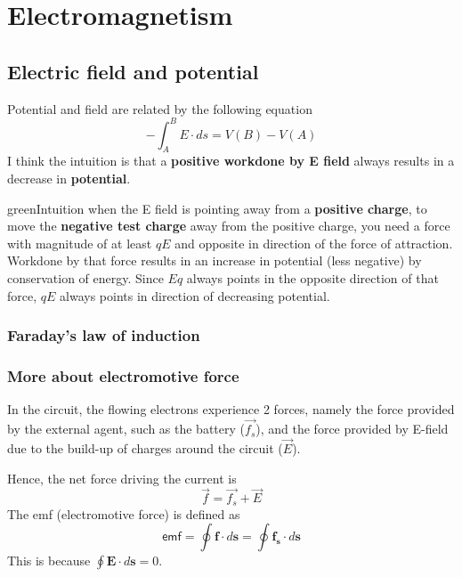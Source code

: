 \chapter{Electromagnetism}
\section{Electric field and potential}
Potential and field are related by the following equation
\begin{equation}
    -\int_A^B E \cdot ds = V(B)-V(A)
\end{equation}
I think the intuition is that a \textbf{positive workdone by E field} always results in a decrease in \textbf{potential}.

\begin{mybox}{green}{Intuition}
    when the E field is pointing away from a \textbf{positive charge}, to move the \textbf{negative test charge} away from the positive charge, you need a force with magnitude of at least $qE$ and opposite in direction of the force of attraction. Workdone by that force results in an increase in potential (less negative) by conservation of energy. Since $Eq$ always points in the opposite direction of that force, $qE$ always points in direction of decreasing potential.
\end{mybox}
\subsection{Faraday's law of induction}
\subsection{More about electromotive force}

In the circuit, the flowing electrons experience 2 forces, namely the force provided by the external agent, such as the battery ($\vec{f_s}$), and the force provided by E-field due to the build-up of charges around the circuit ($\vec{E}$).

Hence, the net force driving the current is
\begin{equation}
    \vec{f}=\vec{f_s}+\vec{E}
\end{equation}
The emf (electromotive force) is defined as
\begin{equation}
    \textsf{emf}=\oint \mathbf{f} \cdot d\mathbf{s}=\oint \mathbf{f_s} \cdot d\mathbf{s}
\end{equation}
This is because $\oint \mathbf{E} \cdot d\mathbf{s}=0$.


